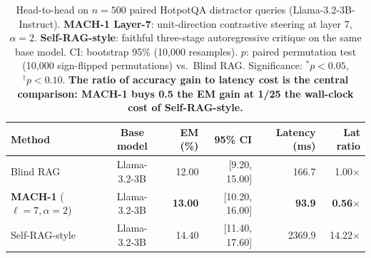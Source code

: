 \begin{table}[htbp]
\caption{Head-to-head on $n\!=\!500$ paired HotpotQA distractor queries (Llama-3.2-3B-Instruct). \textbf{MACH-1 Layer-7}: unit-direction contrastive steering at layer 7, $\alpha\!=\!2$. \textbf{Self-RAG-style}: faithful three-stage autoregressive critique on the same base model. CI: bootstrap 95\% (10{,}000 resamples). $p$: paired permutation test (10{,}000 sign-flipped permutations) vs.\ Blind RAG. Significance: $^{\ast}p<0.05$, $^{\dagger}p<0.10$. \textbf{The ratio of accuracy gain to latency cost is the central comparison: MACH-1 buys 0.5 the EM gain at 1/25 the wall-clock cost of Self-RAG-style.}}
\label{tab:selfrag-h2h}
\centering\renewcommand{\arraystretch}{1.15}
\begin{tabular}{l c r r r r}
\toprule
Method & Base model & EM (\%) & 95\% CI & Latency (ms) & Lat ratio \\
\midrule
Blind RAG               & Llama-3.2-3B & 12.00 & [9.20, 15.00] & 166.7 & 1.00$\times$ \\
\textbf{MACH-1} ($\ell\!=\!7,\alpha\!=\!2$) & Llama-3.2-3B & \textbf{13.00} & [10.20, 16.00] & \textbf{93.9} & \textbf{0.56$\times$} \\
Self-RAG-style          & Llama-3.2-3B & 14.40 & [11.40, 17.60] & 2369.9 & 14.22$\times$ \\
\bottomrule\end{tabular}\end{table}
